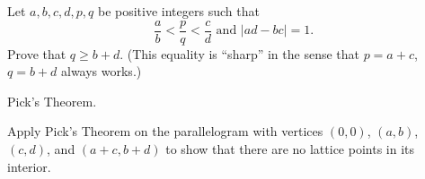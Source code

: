 \begin{problem}
	\yod
	Let $a,b,c,d,p,q$ be positive integers such that
	\[ \frac ab < \frac pq < \frac cd \text{ and } \left\lvert ad-bc \right\rvert=1. \]
	Prove that $q \ge b+d$.
	(This equality is ``sharp'' in the sense that $p=a+c$, $q=b+d$ always works.)
	\begin{hint}
		Pick's Theorem.
	\end{hint}
	\begin{sol}
		Apply Pick's Theorem on the parallelogram with vertices $(0,0)$, $(a,b)$, $(c,d)$, and $(a+c,b+d)$
		to show that there are no lattice points in its interior.
	\end{sol}
\end{problem}

